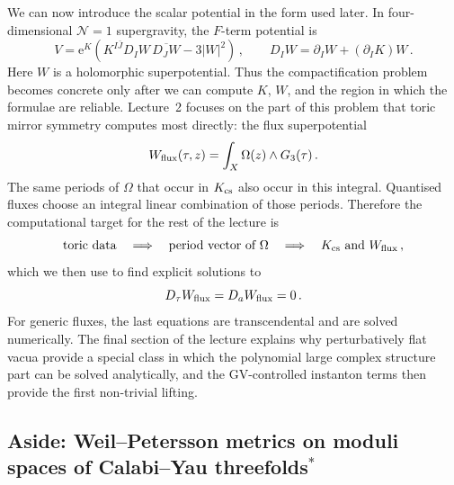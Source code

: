 We can now introduce the scalar potential in the form used later.  In
four-dimensional $\mathcal N=1$ supergravity, the $F$-term potential is
\begin{equation}\label{eq:L2-Fterm-potential}
    V
    =
    \mathrm{e}^K
    \left(K^{I\bar J}D_IW\,\overline{D_JW}-3|W|^2\right)\, ,
    \qquad
    D_IW
    =
    \partial_IW+(\partial_IK)W\, .
\end{equation}
Here $W$ is a holomorphic superpotential.  Thus the compactification
problem becomes concrete only after we can compute $K$, $W$, and the
region in which the formulae are reliable.  Lecture~2 focuses on the
part of this problem that toric mirror symmetry computes most
directly: the flux superpotential
\begin{equation}\label{eq:L2-Wflux-preview}
    W_{\rm flux}(\tau,z)
    =
    \int_X\Omega(z)\wedge G_3(\tau)\, .
\end{equation}
The same periods of $\Omega$ that occur in $K_{\rm cs}$ also occur in
this integral.  Quantised fluxes choose an integral linear combination
of those periods.  Therefore the computational target for the rest of
the lecture is
\begin{equation}\label{eq:L2-computational-target}
    \text{toric data}
    \quad\Longrightarrow\quad
    \text{period vector of }\Omega
    \quad\Longrightarrow\quad
    K_{\rm cs}\text{ and }W_{\rm flux}\, ,
\end{equation}
which we then use to find explicit solutions to
\begin{equation}
D_\tau W_{\rm flux}=D_a W_{\rm flux}=0\, .
\end{equation}
For generic fluxes, the last equations are transcendental and are
solved numerically.  The final section of the lecture explains why
perturbatively flat vacua provide a special class in which the
polynomial large complex structure part can be solved analytically,
and the GV-controlled instanton terms then provide the first
non-trivial lifting.






\subsection{Aside: Weil--Petersson metrics on moduli spaces of Calabi--Yau threefolds\texorpdfstring{$^{\ast}$}{*}}\label{ssec:L2-WP}



